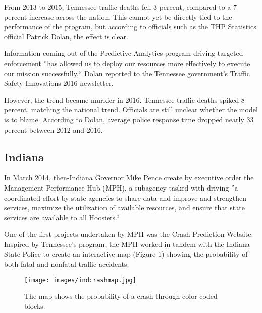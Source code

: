 \documentclass[sigconf]{acmart}
\begin{document}
From 2013 to 2015, Tennessee traffic deaths fell 3 percent, compared to a 7 percent increase across the nation. This cannot yet be directly tied to the performance of the program, but according to officials such as the THP Statistics official Patrick Dolan, the effect is clear.

Information coming out of the Predictive Analytics program driving targeted enforcement ''has allowed us to deploy our resources more effectively to execute our mission successfully,`` Dolan reported to the Tennessee government's Traffic Safety Innovations 2016 newsletter. \cite{tennessee}

However, the trend became murkier in 2016. Tennessee traffic deaths spiked 8 percent, matching the national trend. Officials are still unclear whether the model is to blame. According to Dolan, average police response time dropped nearly 33 percent between 2012 and 2016. \cite{pew}

\subsection{Indiana}
In March 2014, then-Indiana Governor Mike Pence create by executive order the Management Performance Hub (MPH), a subagency tasked with driving ''a coordinated effort by state agencies to share data and improve and strengthen services, maximize the utilization of available resources, and ensure that state services are available to all Hoosiers.``\cite{pence}

One of the first projects undertaken by MPH was the Crash Prediction Website. Inspired by Tennessee's program\cite{govtech}, the MPH worked in tandem with the Indiana State Police to create an interactive map (Figure 1) showing the probability of both fatal and nonfatal traffic accidents. 

\begin{figure}
\texttt{[image: images/indcrashmap.jpg]}
\caption{The map shows the probability of a crash through color-coded blocks.\cite{indcrashmap}}
\end{figure}
\end{document}
